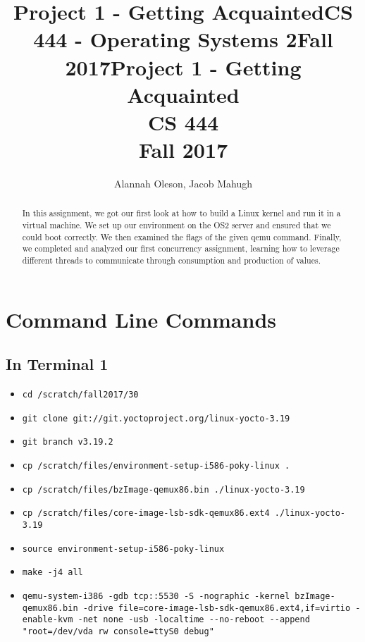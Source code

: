 \documentclass[letterpaper,10pt,titlepage]{article}
\title{Project 1 - Getting Acquainted}
\title{CS 444 - Operating Systems 2}
\title{Fall 2017}
\author{\name}
\def\name{Alannah Oleson, Jacob Mahugh}
\begin{document}
\begin{titlepage}
   \title{Project 1 - Getting Acquainted\\CS 444\\Fall 2017}
   \author{\name}
   \maketitle

   \begin{abstract}
      In this assignment, we got our first look at how to build a Linux kernel and run it in a virtual machine.
      We set up our environment on the OS2 server and ensured that we could boot correctly.
      We then examined the flags of the given qemu command.
      Finally, we completed and analyzed our first concurrency assignment, learning how to leverage different threads to communicate through consumption and production of values.
   \end{abstract}

\end{titlepage}


\section{Command Line Commands}

\subsection{In Terminal 1}

\begin{itemize}
   \item \verb|cd /scratch/fall2017/30|
   \item \verb|git clone git://git.yoctoproject.org/linux-yocto-3.19|
   \item \verb|git branch v3.19.2|
   \item \verb|cp /scratch/files/environment-setup-i586-poky-linux .|
   \item \verb|cp /scratch/files/bzImage-qemux86.bin ./linux-yocto-3.19|
   \item \verb|cp /scratch/files/core-image-lsb-sdk-qemux86.ext4 ./linux-yocto-3.19|
   \item \verb|source environment-setup-i586-poky-linux|
   \item \verb|make -j4 all|
   \item \verb|qemu-system-i386 -gdb tcp::5530 -S -nographic -kernel bzImage-qemux86.bin -drive file=core-image-lsb-sdk-qemux86.ext4,if=virtio -enable-kvm -net none -usb -localtime --no-reboot --append "root=/dev/vda rw console=ttyS0 debug"|
\end{itemize}
\end{document}
